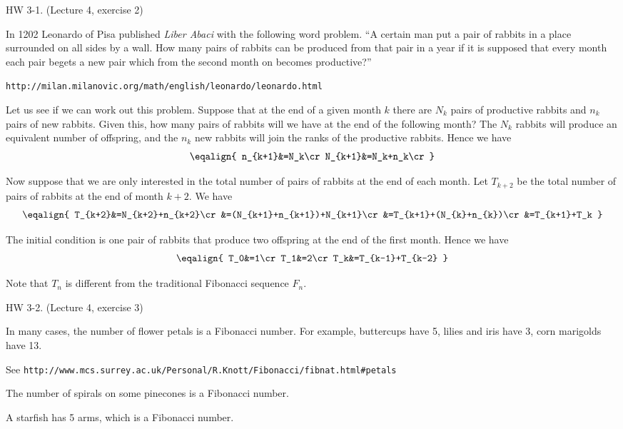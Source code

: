 \beginsection HW 3-1. (Lecture 4, exercise 2)

In 1202 Leonardo of Pisa published {\it Liber Abaci} with the following word problem.
\medskip
``A certain man put a pair of rabbits in a place surrounded on all sides by a wall.
How many pairs of rabbits can be produced from that pair in a year if it is supposed
that every month each pair begets a new pair which from the second month on becomes
productive?''

{\tt http://milan.milanovic.org/math/english/leonardo/leonardo.html}

\medskip
Let us see if we can work out this problem.
Suppose that at the end of a given month $k$ there are
$N_k$ pairs of productive rabbits and $n_k$ pairs of new rabbits.
Given this, how many pairs of rabbits will we have at the end of
the following month?
The $N_k$ rabbits will produce an equivalent number of offspring,
and the $n_k$ new rabbits will join the ranks of the productive rabbits.
Hence we have
$$\eqalign{
n_{k+1}&=N_k\cr
N_{k+1}&=N_k+n_k\cr
}$$

Now suppose that we are only interested in the total number of pairs of rabbits
at the end of each month.
Let $T_{k+2}$ be the total number of pairs of rabbits at the end of month $k+2$.
We have
$$\eqalign{
T_{k+2}&=N_{k+2}+n_{k+2}\cr
&=(N_{k+1}+n_{k+1})+N_{k+1}\cr
&=T_{k+1}+(N_{k}+n_{k})\cr
&=T_{k+1}+T_k
}$$

The initial condition is one pair of rabbits that produce
two offspring at the end of the first month.
Hence we have
$$\eqalign{
T_0&=1\cr
T_1&=2\cr
T_k&=T_{k-1}+T_{k-2}
}$$

Note that $T_n$ is different from the traditional Fibonacci sequence $F_n$.

\beginsection HW 3-2. (Lecture 4, exercise 3)

%
In many cases, the number of flower petals is a Fibonacci number.
For example,
buttercups have 5, lilies and iris have 3, corn marigolds have 13.\par
\noindent See {\tt http://www.mcs.surrey.ac.uk/Personal/R.Knott/Fibonacci/fibnat.html\#petals}

\medskip
The number of spirals on some pinecones is a Fibonacci number.

\medskip
A starfish has 5 arms, which is a Fibonacci number.

